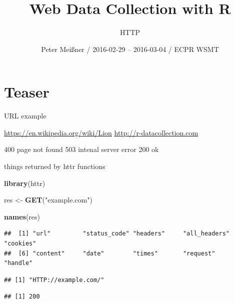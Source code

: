 \documentclass[ignorenonframetext,]{beamer}
\title{Web Data Collection with R}
\subtitle{HTTP}
\author{Peter Meißner / 2016-02-29 -- 2016-03-04 / ECPR WSMT}
\date{}
\newenvironment{Shaded}{\begin{snugshade}}{\end{snugshade}}
\newcommand{\KeywordTok}[1]{\textcolor[rgb]{0.13,0.29,0.53}{\textbf{{#1}}}}
\newcommand{\StringTok}[1]{\textcolor[rgb]{0.31,0.60,0.02}{{#1}}}
\newcommand{\NormalTok}[1]{{#1}}
\begin{document}
\frame{\titlepage}

\begin{frame}
\tableofcontents[hideallsubsections]
\end{frame}

\section{Teaser}\label{teaser}

\begin{frame}{URL example}

\url{https://en.wikipedia.org/wiki/Lion}
\url{http://r-datacollection.com}

400 page not found 503 intenal server error 200 ok

\end{frame}

\begin{frame}[fragile]{things returned by httr functions}

\begin{Shaded}
\begin{Highlighting}[]
\KeywordTok{library}\NormalTok{(httr)}

\NormalTok{res <-}\StringTok{ }\KeywordTok{GET}\NormalTok{(}\StringTok{"example.com"}\NormalTok{)}

\KeywordTok{names}\NormalTok{(res)}
\end{Highlighting}
\end{Shaded}

\begin{verbatim}
##  [1] "url"         "status_code" "headers"     "all_headers" "cookies"    
##  [6] "content"     "date"        "times"       "request"     "handle"
\end{verbatim}

\begin{Shaded}
\end{Shaded}

\begin{verbatim}
## [1] "HTTP://example.com/"
\end{verbatim}

\begin{Shaded}
\end{Shaded}

\begin{verbatim}
## [1] 200
\end{verbatim}

\end{frame}
\end{document}
